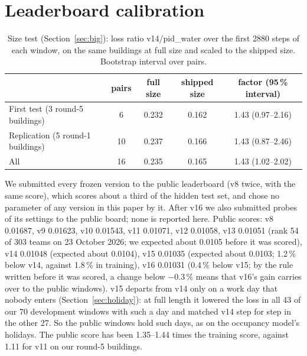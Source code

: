 \documentclass{article}
\begin{document}
\section{Leaderboard calibration}\label{app:lb}
\begin{table}[!htb]\centering
\caption{Size test (Section~\ref{sec:big}): loss ratio v14/pid\_water over the first 2880 steps of each window, on
the same buildings at full size and scaled to the shipped size. Bootstrap interval over pairs.}
\label{tab:size}
\small
\begin{tabular}{lcccc}
\toprule
 & pairs & full size & shipped size & factor (95\,\% interval) \\
\midrule
First test (3 round-5 buildings) & 6 & 0.232 & 0.162 & 1.43 (0.97--2.16) \\
Replication (5 round-1 buildings) & 10 & 0.237 & 0.166 & 1.43 (0.87--2.46) \\
All & 16 & 0.235 & 0.165 & 1.43 (1.02--2.02) \\
\bottomrule
\end{tabular}
\end{table}
We submitted every frozen version to the public leaderboard (v8 twice, with the same score), which scores about a
third of the hidden test set, and chose no parameter of any version in this paper by it. After v16 we also submitted
probes of its settings to the public board; none is reported here. Public scores: v8 0.01687, v9 0.01623, v10 0.01543,
v11 0.01071, v12 0.01058, v13 0.01051 (rank 54 of 303 teams on 23 October 2026; we expected about 0.0105 before it
was scored), v14 0.01048 (expected about 0.0104), v15 0.01035 (expected about 0.0103; 1.2\,\% below v14, against
1.8\,\% in training), v16 0.01031 (0.4\,\% below v15; by the rule written before it was scored, a change below
$-0.3$\,\% means that v16's gain carries over to the public windows). v15 departs from v14 only on a work day that nobody enters (Section~\ref{sec:holiday}): at full length it lowered the loss in all 43 of our 70 development windows with such a day and matched v14 step for step in the other 27. So the
public windows hold such days, as on the occupancy model's holidays. The public
score has been 1.35--1.44 times the training score, against 1.11 for v11 on our round-5 buildings.
\end{document}
